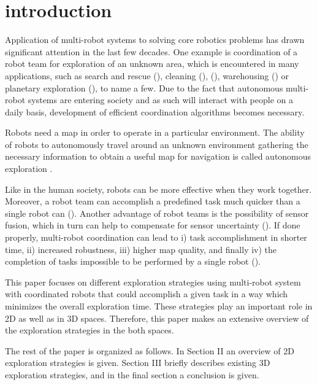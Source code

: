 \section{introduction}


Application of multi-robot systems to solving core robotics problems has drawn significant attention in the last few decades. One example is coordination of a robot team for exploration of an unknown area, which is encountered in many applications, such as search and rescue (\cite{Murphy2004}), cleaning (\cite{Endres}), (\cite{Pinheiro2015}), warehousing (\cite{Wurman2008}) or planetary exploration (\cite{Mataric2001}), to name a few. Due to the fact that autonomous multi-robot systems are entering society and as such will interact with people on a daily basis, development of efficient coordination algorithms becomes necessary.

Robots need a map in order to operate in a particular environment. The ability of robots to autonomously travel around an unknown environment gathering the necessary information to obtain a useful map for navigation is called autonomous exploration \cite{Julia2012}. 

Like in the human society, robots can be more effective when they work together. Moreover, a robot team can accomplish a predefined task much quicker than a single robot can (\cite{Dias2000}). Another advantage of robot teams is the possibility of sensor fusion, which in turn can help to compensate for sensor uncertainty (\cite{Wurm2008}).
If done properly, multi-robot coordination can lead to i) task accomplishment in shorter time, ii) increased robustness, iii) higher map quality, and finally iv) the completion of tasks impossible to be performed by a single robot (\cite{Dias2006}).

This paper focuses on different exploration strategies using multi-robot system with coordinated robots that could accomplish a given task in a way which minimizes the overall exploration time. These strategies play an important role in 2D as well as in 3D spaces. Therefore, this paper makes an extensive overview of the exploration strategies in the both spaces.
 
The rest of the paper is organized as follows. 
In Section II an overview of 2D exploration strategies is given. Section
III briefly describes existing 3D exploration strategies, and in the final section a conclusion is given.



